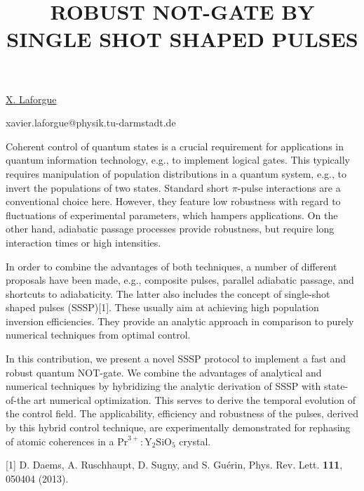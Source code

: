 \title{ROBUST NOT-GATE BY SINGLE SHOT SHAPED PULSES}

\underline{X. Laforgue} 

{\normalsize{\vspace{-4mm}
\dijon
\vspace{-4mm}

\darmstadt

\email xavier.laforgue@physik.tu-darmstadt.de}}

Coherent control of quantum states is a crucial requirement for applications in quantum information technology, e.g., to implement logical gates. This typically requires manipulation of population distributions in a quantum system, e.g., to invert the populations of two states. Standard short $\pi$-pulse interactions are a conventional choice here. However, they feature low robustness with regard to fluctuations of experimental parameters, which hampers applications. On the other hand, adiabatic passage processes provide robustness, but require long interaction times or high intensities.

In order to combine the advantages of both techniques, a number of different proposals have been made, e.g., composite pulses, parallel adiabatic passage, and shortcuts to adiabaticity. The latter also includes the concept of single-shot shaped pulses (SSSP)[1]. These usually aim at achieving high population inversion efficiencies. They provide an analytic approach in comparison to purely numerical techniques from optimal control.

In this contribution, we present a novel SSSP protocol to implement a fast and robust quantum NOT-gate. We combine the advantages of analytical and numerical techniques by hybridizing the analytic derivation of SSSP with state-of-the art numerical optimization. This serves to derive the temporal evolution of the control field. The applicability, efficiency and robustness of the pulses, derived by this hybrid control technique, are experimentally demonstrated for rephasing of atomic coherences in a $\mathrm{Pr}^{3+}:\mathrm{Y}_2\mathrm{SiO}_5$ crystal.

{\normalsize
[1] D. Daems, A. Ruschhaupt, D. Sugny, and S. Gu\'erin, Phys. Rev. Lett. \textbf{111}, 050404 (2013).
}

\vspace{\baselineskip} 